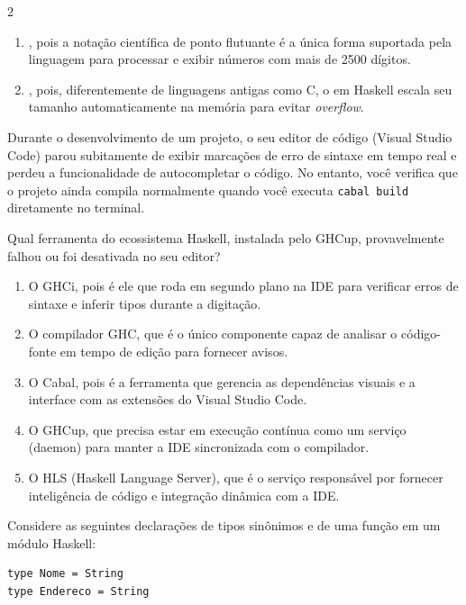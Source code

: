 \documentclass[a4paper,10pt,brazil]{article}
\begin{document}
\begin{multicols}{2}
\begin{enumerate}
  \item {}, pois a notação científica de ponto flutuante é a única forma suportada pela linguagem para processar e exibir números com mais de 2500 dígitos.

  \item {}, pois, diferentemente de linguagens antigas como C, o  em Haskell escala seu tamanho automaticamente na memória para evitar \emph{overflow}.


\end{enumerate}

Durante o desenvolvimento de um projeto, o seu editor de código (Visual Studio Code) parou subitamente de exibir marcações de erro de sintaxe em tempo real e perdeu a funcionalidade de autocompletar o código. No entanto, você verifica que o projeto ainda compila normalmente quando você executa \texttt{cabal build} diretamente no terminal. 

Qual ferramenta do ecossistema Haskell, instalada pelo GHCup, provavelmente falhou ou foi desativada no seu editor?

\begin{enumerate}
  \item O GHCi, pois é ele que roda em segundo plano na IDE para verificar erros de sintaxe e inferir tipos durante a digitação.

  \item O compilador GHC, que é o único componente capaz de analisar o código-fonte em tempo de edição para fornecer avisos.

  \item O Cabal, pois é a ferramenta que gerencia as dependências visuais e a interface com as extensões do Visual Studio Code.

  \item O GHCup, que precisa estar em execução contínua como um serviço (daemon) para manter a IDE sincronizada com o compilador.

  \item O HLS (Haskell Language Server), que é o serviço responsável por fornecer inteligência de código e integração dinâmica com a IDE.


\end{enumerate}

Considere as seguintes declarações de tipos sinônimos e de uma função em um módulo Haskell:

\begin{verbatim}
type Nome = String
type Endereco = String


\end{verbatim}
\end{multicols}
\end{document}

